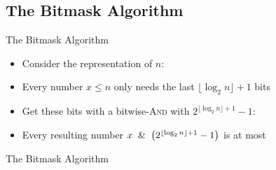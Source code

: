 \subsection{The Bitmask Algorithm}\label{sec:2.3}
\begin{frame}{The Bitmask Algorithm}
    \pause 
    \begin{itemize}[<+->]
        \item Consider the  representation of $n$:  
        \item Every number $x \leq n$ only needs the last $\lfloor\log_2n\rfloor + 1$ bits
        \item Get these bits with a bitwise-\textsc{And} with $2^{\lfloor\log_2n\rfloor + 1} - 1$: 
        \item Every resulting number $x \And \left(2^{\lfloor\log_2n\rfloor + 1} - 1\right)$ is at most 
    \end{itemize}
\end{frame}

\begin{frame}{The Bitmask Algorithm}
    \pause 
    
\end{frame}






